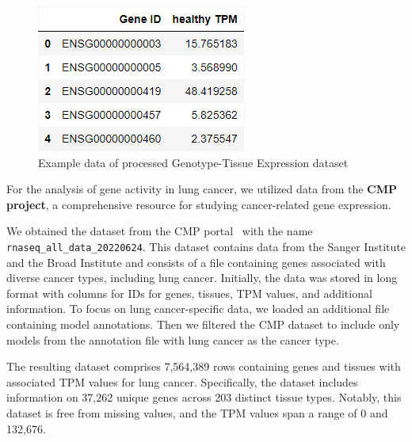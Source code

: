 \begin{figure}[h]
    \centering
    \includegraphics[height=\dfheight]{figures/03_01_GTEX_healthy_mean}
    \caption{Example data of processed Genotype-Tissue Expression dataset}
    \label{fig:03_01_df_GTEX_healthy_mean}
\end{figure}




For the analysis of gene activity in lung cancer, we utilized data from the \textbf{CMP project},
a comprehensive resource for studying cancer-related gene expression.

We obtained the dataset from the CMP portal~\cite{cmp_download} with the name \texttt{rnaseq\_all\_data\_20220624}.
This dataset contains data from the Sanger Institute and the Broad Institute and
consists of a file containing genes associated with diverse cancer types, including lung cancer.
Initially, the data was stored in long format with columns for IDs for genes, tissues, TPM values, and additional information.
To focus on lung cancer-specific data, we loaded an additional file containing model annotations. \cite{cmp_tissue_models}
Then we filtered the CMP dataset to include only models from the annotation file with lung cancer as the cancer type.

The resulting dataset comprises 7,564,389 rows containing genes and tissues with associated TPM values for lung cancer.
Specifically, the dataset includes information on 37,262 unique genes across 203 distinct tissue types.
Notably, this dataset is free from missing values, and the TPM values span a range of 0 and 132,676.

